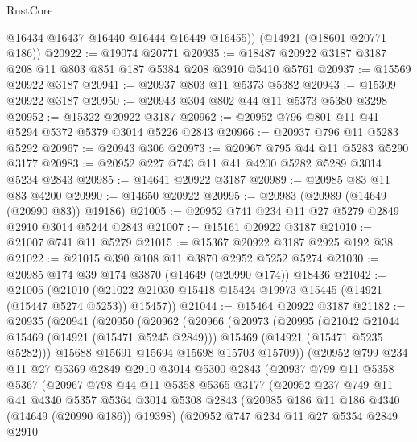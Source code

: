 \begin{lexlean}{RustCore}
\begin{coremodule}
        @16434
        @16437
        @16440
        @16444
        @16449
        @16455))
    (@14921 (@18601 @20771 @186))
@20922 := @19074 @20771
@20935 := @18487 @20922 @3187 @3187 @208 @11 @803 @851 @187 @5384 @208 @3910 @5410 @5761
@20937 := @15569 @20922 @3187
@20941 := @20937 @803 @11 @5373 @5382
@20943 := @15309 @20922 @3187
@20950 := @20943 @304 @802 @44 @11 @5373 @5380 @3298
@20952 := @15322 @20922 @3187
@20962 := @20952 @796 @801 @11 @41 @5294 @5372 @5379 @3014 @5226 @2843
@20966 := @20937 @796 @11 @5283 @5292
@20967 := @20943 @306
@20973 := @20967 @795 @44 @11 @5283 @5290 @3177
@20983 := @20952 @227 @743 @11 @41 @4200 @5282 @5289 @3014 @5234 @2843
@20985 := @14641 @20922 @3187
@20989 := @20985 @83 @11 @83 @4200
@20990 := @14650 @20922
@20995 := @20983 (@20989 (@14649 (@20990 @83)) @19186)
@21005 := @20952 @741 @234 @11 @27 @5279 @2849 @2910 @3014 @5244 @2843
@21007 := @15161 @20922 @3187
@21010 := @21007 @741 @11 @5279
@21015 := @15367 @20922 @3187 @2925 @192 @38
@21022 := @21015 @390 @108 @11 @3870 @2952 @5252 @5274
@21030 := @20985 @174 @39 @174 @3870 (@14649 (@20990 @174)) @18436
@21042 := @21005
    (@21010 (@21022 @21030 @15418 @15424 @19973 @15445 (@14921 (@15447 @5274 @5253)) @15457))
@21044 := @15464 @20922 @3187
@21182 := @20935
    (@20941
      (@20950
        (@20962
          (@20966
            (@20973
              (@20995
                (@21042 @21044 @15469 (@14921 (@15471 @5245 @2849)))
                @15469
                (@14921 (@15471 @5235 @5282)))
              @15688
              @15691
              @15694
              @15698
              @15703
              @15709))
          (@20952
            @799
            @234
            @11
            @27
            @5369
            @2849
            @2910
            @3014
            @5300
            @2843
            (@20937
              @799
              @11
              @5358
              @5367
              (@20967
                @798
                @44
                @11
                @5358
                @5365
                @3177
                (@20952
                  @237
                  @749
                  @11
                  @41
                  @4340
                  @5357
                  @5364
                  @3014
                  @5308
                  @2843
                  (@20985 @186 @11 @186 @4340 (@14649 (@20990 @186)) @19398)
                  (@20952
                    @747
                    @234
                    @11
                    @27
                    @5354
                    @2849
                    @2910

\end{coremodule}
\end{lexlean}
